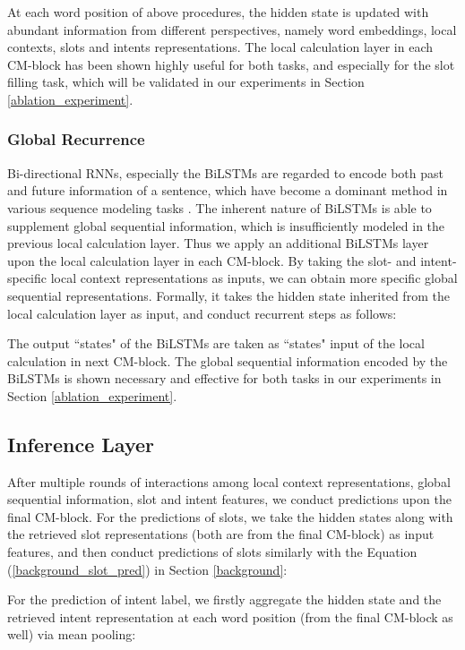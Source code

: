 \documentclass[11pt,a4paper]{article}
\begin{document}
At each word position of above procedures, the hidden state is updated with abundant information from different perspectives, namely word embeddings, local contexts, slots and intents representations. The local calculation layer in each CM-block has been shown highly useful for both tasks, and especially for the slot filling task, which will be validated in our experiments in Section \ref{ablation_experiment}.

\subsubsection*{Global Recurrence}
Bi-directional RNNs, especially the BiLSTMs \cite{LSTM_1997} are regarded to encode both past and future information of a sentence, which have become a dominant method in various sequence modeling tasks \cite{first_LSTM_2003,lstm_lm_2012}. 
The inherent nature of BiLSTMs is able to supplement  global sequential information, which is insufficiently modeled in the previous local calculation layer. 
Thus we apply an additional BiLSTMs layer upon the local calculation layer in each CM-block. By taking the slot- and intent-specific local context representations as inputs, we can obtain more specific global sequential representations. Formally, it takes the hidden state  inherited from the local calculation layer as input, and conduct recurrent steps as follows:

The output ``states" of the BiLSTMs are taken as ``states" input of the local calculation in next CM-block. The global sequential information encoded by the BiLSTMs is shown necessary and effective for both tasks in our experiments in Section  \ref{ablation_experiment}.


\subsection{Inference Layer}
After multiple rounds of interactions among local context representations, global sequential information, slot and intent features, we conduct predictions upon the final CM-block.
For the predictions of slots, we take the hidden states  along with the retrieved slot  representations (both are from the final CM-block) as input features, and then conduct predictions of slots similarly with the Equation (\ref{background_slot_pred}) in Section \ref{background}:

For the prediction of intent label, we firstly aggregate the hidden state  and the retrieved intent representation  at each word position (from the final CM-block as well) via mean pooling:
\end{document}
